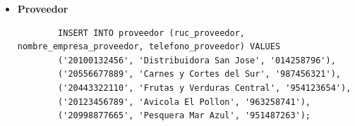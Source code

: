 \begin{itemize}
    \item \textbf{Proveedor}
    \begin{listing}[H]
        \centering
        \begin{verbatim}
        INSERT INTO proveedor (ruc_proveedor, nombre_empresa_proveedor, telefono_proveedor) VALUES
        ('20100132456', 'Distribuidora San Jose', '014258796'),
        ('20556677889', 'Carnes y Cortes del Sur', '987456321'),
        ('20443322110', 'Frutas y Verduras Central', '954123654'),
        ('20123456789', 'Avicola El Pollon', '963258741'),
        ('20998877665', 'Pesquera Mar Azul', '951487263');
        \end{verbatim}
        \caption{Fragmento de código SQL para la inserción de registros en la tabla \texttt{proveedor}.}
        \label{lst:insert_proveedor}
    \end{listing}

    \newpage


\end{itemize}
